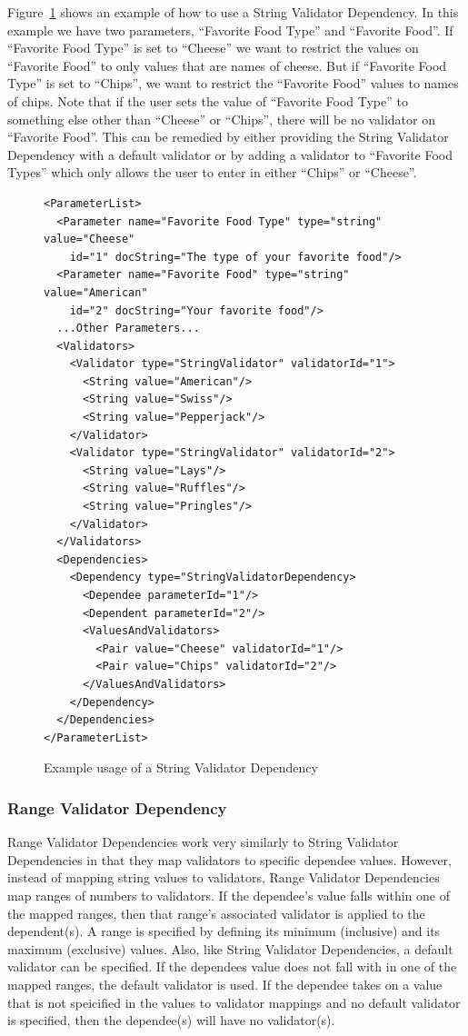 Figure~\ref{StringValiDepXML} shows an example of how to use a String Validator Dependency. In this example we have two parameters, 
``Favorite Food Type''
and ``Favorite Food''. If ``Favorite Food Type'' is set to ``Cheese'' we want to restrict the values on ``Favorite Food'' to only values that are names
of cheese. But if ``Favorite Food Type'' is set to ``Chips'', we want to restrict the ``Favorite Food'' values to names of chips. Note that if the user
sets the value of ``Favorite Food Type'' to something else other than ``Cheese'' or ``Chips'', there will be no validator on ``Favorite Food''. This can
be remedied by either providing the String Validator Dependency with a default validator or by adding a validator to ``Favorite Food Types'' which only
allows the user to enter in either ``Chips'' or ``Cheese''.
\begin{figure}
\centering
{\footnotesize
\begin{Verbatim}
<ParameterList>
  <Parameter name="Favorite Food Type" type="string" value="Cheese"
    id="1" docString="The type of your favorite food"/>
  <Parameter name="Favorite Food" type="string" value="American"
    id="2" docString="Your favorite food"/>
  ...Other Parameters...
  <Validators>
    <Validator type="StringValidator" validatorId="1">
      <String value="American"/>
      <String value="Swiss"/>
      <String value="Pepperjack"/>
    </Validator>
    <Validator type="StringValidator" validatorId="2">
      <String value="Lays"/>
      <String value="Ruffles"/>
      <String value="Pringles"/>
    </Validator>
  </Validators>
  <Dependencies>
    <Dependency type="StringValidatorDependency>
      <Dependee parameterId="1"/>
      <Dependent parameterId="2"/>
      <ValuesAndValidators>
        <Pair value="Cheese" validatorId="1"/>
        <Pair value="Chips" validatorId="2"/>
      </ValuesAndValidators>
    </Dependency>
  </Dependencies>
</ParameterList>
\end{Verbatim}
}
\caption{Example usage of a String Validator Dependency}
\label{StringValiDepXML}
\end{figure}

\subsubsection{Range Validator Dependency}
Range Validator Dependencies work very similarly to String Validator Dependencies in that they map validators to specific dependee values. However,
instead of mapping string values to validators, Range Validator Dependencies map ranges of numbers to validators. If the dependee's value falls within one of the 
mapped ranges, then that range's associated validator is applied to the dependent(s). A range is specified by defining its minimum (inclusive) and its maximum (exclusive) 
values. Also, like String Validator Dependencies, a default validator can be specified. If the dependees value does not fall with in one of the mapped ranges, the default 
validator is used. If the dependee takes on a value that is not speicified in the values to validator mappings and no default validator is specified, then the 
dependee(s) will have no validator(s).

